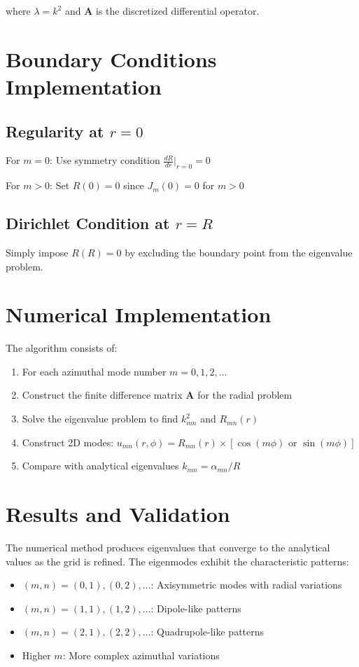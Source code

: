 \documentclass[11pt,a4paper]{article}
\begin{document}
where $\lambda = k^2$ and $\mathbf{A}$ is the discretized differential operator.

\section{Boundary Conditions Implementation}

\subsection{Regularity at $r = 0$}
For $m = 0$: Use symmetry condition $\frac{dR}{dr}|_{r=0} = 0$

For $m > 0$: Set $R(0) = 0$ since $J_m(0) = 0$ for $m > 0$

\subsection{Dirichlet Condition at $r = R$}
Simply impose $R(R) = 0$ by excluding the boundary point from the eigenvalue problem.

\section{Numerical Implementation}

The algorithm consists of:

\begin{enumerate}
\item For each azimuthal mode number $m = 0, 1, 2, \ldots$
\item Construct the finite difference matrix $\mathbf{A}$ for the radial problem
\item Solve the eigenvalue problem to find $k_{mn}^2$ and $R_{mn}(r)$
\item Construct 2D modes: $u_{mn}(r,\phi) = R_{mn}(r) \times [\cos(m\phi) \text{ or } \sin(m\phi)]$
\item Compare with analytical eigenvalues $k_{mn} = \alpha_{mn}/R$
\end{enumerate}

\section{Results and Validation}

The numerical method produces eigenvalues that converge to the analytical values as the grid is refined. The eigenmodes exhibit the characteristic patterns:

\begin{itemize}
\item $(m,n) = (0,1), (0,2), \ldots$: Axisymmetric modes with radial variations
\item $(m,n) = (1,1), (1,2), \ldots$: Dipole-like patterns
\item $(m,n) = (2,1), (2,2), \ldots$: Quadrupole-like patterns
\item Higher $m$: More complex azimuthal variations
\end{itemize}
\end{document}
